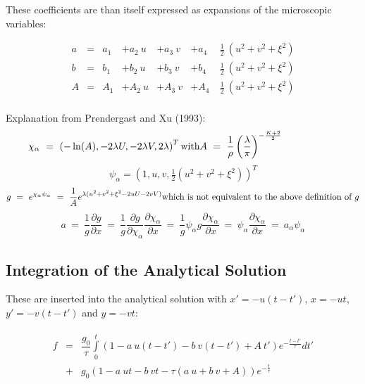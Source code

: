 \documentclass[
	pdftex,             %
	12pt,				%
	a4paper,		   	%
	english,				%
	oneside,			%
]{article}
\begin{document}
These coefficients are than itself expressed as expansions of the microscopic variables:

\begin{equation}
\begin{array}{lclllll}
a &=& a_1 &+ a_2~u &+ a_3~v &+ a_4~&\frac{1}{2}~(u^2 + v^2 + \xi^2) \\
b &=& b_1 &+ b_2~u &+ b_3~v &+ b_4~&\frac{1}{2}~(u^2 + v^2 + \xi^2) \\
A &=& A_1 &+ A_2~u &+ A_3~v &+ A_4~&\frac{1}{2}~(u^2 + v^2 + \xi^2) \\
\end{array}
\end{equation}

Explanation from Prendergast and Xu (1993):
\begin{equation}
\chi_\alpha ~=~ \left( -\ln(A), -2\lambda U, -2\lambda V, 2\lambda \right)^T
\hfill
\textnormal{with}
A ~=~ \dfrac{1}{\rho} \left( \frac{\lambda}{\pi} \right)^{-\frac{K+2}{2}}
\hspace{2cm}
\end{equation}
\begin{equation}
\psi_\alpha = \left( 1, u, v, \tfrac{1}{2} (u^2 + v^2 + \xi^2 ) \right)^T
\end{equation}
\begin{equation}
g ~=~ e^{\chi_\alpha \psi_\alpha}
  ~=~ \dfrac{1}{A} e^{ \lambda ( u^2 + v^2 + \xi^2 - 2uU - 2vV) }
\hfill
\textnormal{which is not equivalent to the above definition of $g$}
\end{equation}
\begin{equation}
a ~=~ \dfrac{1}{g} \dfrac{\partial g}{\partial x}
  ~=~ \dfrac{1}{g} \dfrac{\partial g}{\partial \chi_\alpha}\dfrac{\partial \chi_\alpha}{\partial x}
  ~=~ \dfrac{1}{g} \psi_\alpha g \dfrac{\partial \chi_\alpha}{\partial x}
  ~=~ \psi_\alpha \dfrac{\partial \chi_\alpha}{\partial x}
  ~=~ a_\alpha \psi_\alpha
\end{equation}


\clearpage

\subsection*{Integration of the Analytical Solution}

These are inserted into the analytical solution with $x' = -u(t-t')$, $x = -ut$, $y' = -v(t-t')$ and $y = -vt$:

\begin{equation}
\begin{split}
\begin{array}{lcll}
f
&=&
\dfrac{g_0}{\tau} \int \limits_0^t
\left( 1 - a~u(t-t') - b~v(t-t') + A~t' \right) e^{-\tfrac{t-t'}{\tau}} dt'
\\
&+&
g_0 \left( 1 - a~ut - b~vt - \tau \left( a~u + b~v + A \right) \right) e^{-\tfrac{t}{\tau}}
\end{array}
\end{split}
\end{equation}
\end{document}
